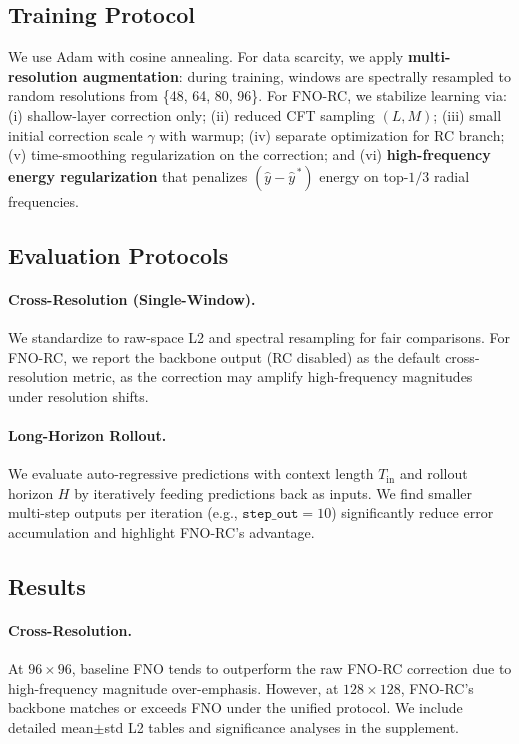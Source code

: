 \subsection{Training Protocol}
We use Adam with cosine annealing. For data scarcity, we apply \textbf{multi-resolution augmentation}: during training, windows are spectrally resampled to random resolutions from \{48, 64, 80, 96\}. For FNO-RC, we stabilize learning via: (i) shallow-layer correction only; (ii) reduced CFT sampling $(L,M)$; (iii) small initial correction scale $\gamma$ with warmup; (iv) separate optimization for RC branch; (v) time-smoothing regularization on the correction; and (vi) \textbf{high-frequency energy regularization} that penalizes $(\hat{y}-\hat{y}^{\,\ast})$ energy on top-$1/3$ radial frequencies.

\subsection{Evaluation Protocols}
\paragraph{Cross-Resolution (Single-Window).} We standardize to raw-space L2 and spectral resampling for fair comparisons. For FNO-RC, we report the backbone output (RC disabled) as the default cross-resolution metric, as the correction may amplify high-frequency magnitudes under resolution shifts.

\paragraph{Long-Horizon Rollout.} We evaluate auto-regressive predictions with context length $T_{\text{in}}$ and rollout horizon $H$ by iteratively feeding predictions back as inputs. We find smaller multi-step outputs per iteration (e.g., $\texttt{step\_out}=10$) significantly reduce error accumulation and highlight FNO-RC's advantage.

\subsection{Results}
\paragraph{Cross-Resolution.} At $96\times 96$, baseline FNO tends to outperform the raw FNO-RC correction due to high-frequency magnitude over-emphasis. However, at $128\times 128$, FNO-RC's backbone matches or exceeds FNO under the unified protocol. We include detailed mean$\pm$std L2 tables and significance analyses in the supplement.

